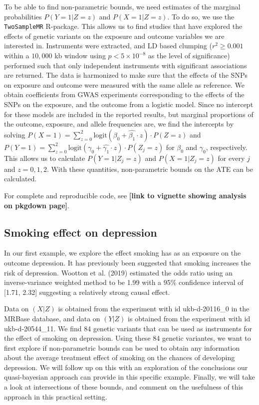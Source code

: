 \documentclass[
]{article}
\theoremstyle{plain}
\begin{document}
To be able to find non-parametric bounds, we need estimates of the marginal probabilities \(P(Y = 1 | Z = z)\) and \(P(X = 1 | Z = z)\). To do so, we use the \texttt{TwoSampleMR} R-package. This allows us to find studies that have explored the effects of genetic variants on the exposure and outcome variables we are interested in. Instruments were extracted, and LD based clumping (\(r^2 \ge 0.001\) within a \(10,000\) kb window using \(p < 5 \times 10^{-8}\) as the level of significance) performed such that only independent instruments with significant associations are returned. The data is harmonized to make sure that the effects of the SNPs on exposure and outcome were measured with the same allele as reference. We obtain coefficients from GWAS experiments corresponding to the effects of the SNPs on the exposure, and the outcome from a logistic model. Since no intercept for these models are included in the reported results, but marginal proportions of the outcome, exposure, and allele frequencies are, we find the intercepts by solving \(P(X = 1) = \sum_{z = 0}^2\text{logit}(\beta_0 + \hat{\beta_1}\cdot z)\cdot P(Z = z)\) and \(P(Y = 1) = \sum_{z = 0}^2\text{logit}(\gamma_0 + \hat{\gamma_1}\cdot z)\cdot P(Z_j = z)\) for \(\beta_0\) and \(\gamma_0\), respectively. This allows us to calculate \(P(Y = 1 | Z_j = z)\) and \(P(X = 1 | Z_j = z)\) for every \(j\) and \(z=0,1,2\). With these quantities, non-parametric bounds on the ATE can be calculated.

For complete and reproducible code, see \textbf{{[}link to vignette showing analysis on pkgdown page{]}}.

\hypertarget{smoking-effect-on-depression}{%
\subsection{Smoking effect on depression}\label{smoking-effect-on-depression}}

In our first example, we explore the effect smoking has as an exposure on the outcome depression. It has previously been suggested that smoking increases the risk of depression. Wootton et al. (2019) estimated the odds ratio using an inverse-variance weighted method to be 1.99 with a 95\% confidence interval of {[}1.71, 2.32{]} suggesting a relatively strong causal effect.

Data on \((X|Z)\) is obtained from the experiment with id ukb-d-20116\_0 in the MRBase database, and data on \((Y|Z)\) is obtained from the experiment with id ukb-d-20544\_11. We find 84 genetic variants that can be used as instruments for the effect of smoking on depression. Using these 84 genetic variantes, we want to first explore if non-parametric bounds can be used to obtain any information about the average treatment effect of smoking on the chances of developing depression. We will follow up on this with an exploration of the conclusions our quasi-bayesian approach can provide in this specific example. Finally, we will take a look at intersections of these bounds, and comment on the usefulness of this approach in this practical setting.
\end{document}
